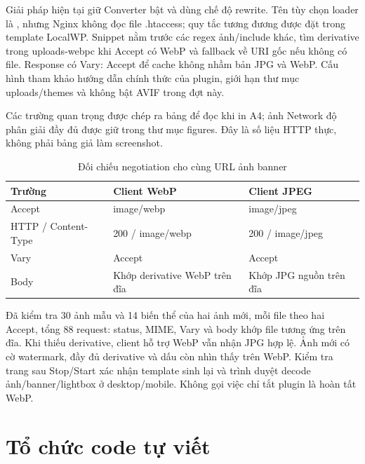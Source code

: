 Giải pháp hiện tại giữ Converter bật và dùng chế độ rewrite. Tên tùy chọn loader là , nhưng Nginx không đọc file .htaccess; quy tắc tương đương được đặt trong template LocalWP. Snippet nằm trước các regex ảnh/include khác, tìm derivative trong uploads-webpc khi Accept có WebP và fallback về URI gốc nếu không có file. Response có Vary: Accept để cache không nhầm bản JPG và WebP. Cấu hình tham khảo hướng dẫn chính thức của plugin, giới hạn thư mục uploads/themes và không bật AVIF trong đợt này.\cite{converterNginx}

Các trường quan trọng được chép ra bảng để đọc khi in A4; ảnh Network độ phân giải đầy đủ được giữ trong thư mục figures. Đây là số liệu HTTP thực, không phải bảng giả làm screenshot.
\begin{table}[H]\centering\small
\caption{Đối chiếu negotiation cho cùng URL ảnh banner}
\begin{tabularx}{\linewidth}{YYY}\toprule Trường & Client WebP & Client JPEG\\\midrule
Accept & image/webp & image/jpeg\\
HTTP / Content-Type & 200 / image/webp & 200 / image/jpeg\\
Vary & Accept & Accept\\
Body & Khớp derivative WebP trên đĩa & Khớp JPG nguồn trên đĩa\\\bottomrule
\end{tabularx}\end{table}

Đã kiểm tra 30 ảnh mẫu và 14 biến thể của hai ảnh mới, mỗi file theo hai Accept, tổng 88 request: status, MIME, Vary và body khớp file tương ứng trên đĩa. Khi thiếu derivative, client hỗ trợ WebP vẫn nhận JPG hợp lệ. Ảnh mới có cờ watermark, đầy đủ derivative và dấu còn nhìn thấy trên WebP. Kiểm tra trang sau Stop/Start xác nhận template sinh lại và trình duyệt decode ảnh/banner/lightbox ở desktop/mobile. Không gọi việc chỉ tắt plugin là hoàn tất WebP.

\section{Tổ chức code tự viết}
